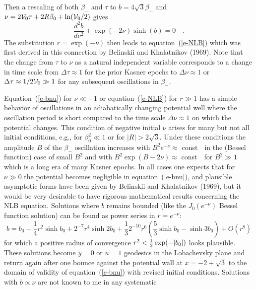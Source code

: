 Then a rescaling of both $\beta_-$ and $\tau$ to $b=4\sqrt{3}\beta_-$
and $\nu = 2{\cal V}_0 \tau + 2R\beta_0 + \ln({\cal V}_0/2)$ gives
\begin{equation}\label{e-bnu}
   \frac{d^2 b}{d\nu^2} + \exp(-2\nu) \sinh(b) = 0 \quad .
\end{equation}
The substitution $r = \exp(-\nu)$ then leads to
equation~(\ref{e-NLB}) which was first derived in this connection by
Belinskii and Khalatnikov (1969). Note that the change from $\tau$
to $\nu$ as a natural independent variable corresponds to a change in
time scale from $\Delta\tau \approx 1$ for the prior Kasner epochs to
$\Delta\nu \approx 1$ or $\Delta\tau \approx 1/2{\cal V}_0 \gg 1$ for
any subsequent oscillations in $\beta_-$.

Equation~(\ref{e-bnu}) for $\nu \ll -1$ or equation~(\ref{e-NLB}) for
$r \gg 1$ has a simple behavior of oscillations in an adiabatically
changing potential well where the oscillation period is short
compared to the time scale $\Delta\nu \approx 1$ on which the
potential changes.  This condition of negative initial $\nu$
arises for many but not all initial conditions, e.g., for $\beta_0^2
\ll 1$ or for $|R| > 2\sqrt{3}$.  Under these conditions the
amplitude $B$ of the $\beta_-$ oscillation increases with $B^2
e^{-\nu} \approx$ const\ \ in the (Bessel function) case of small
$B^2$ and with $B^2\exp(B-2\nu) \approx$ const\ \ for $B^2 \gg 1$
which is a long era of many Kasner epochs.  In all cases one expects
that for $\nu \gg 0$ the potential becomes negligible in
equation~(\ref{e-bnu}), and plausible asymptotic forms have been
given by Belinskii and Khalatnikov (1969), but it would be very
desirable to have rigorous mathematical results concerning the NLB
equation.  Solutions where $b$ remains bounded (like the
$J_0(e^{-\nu})$ Bessel function solution) can be found as power
series in $r=e^{-\nu}$:
\begin{equation}
   b = b_0 - \mbox{$\frac{1}{4}$} r^2 \sinh b_0 + 2^{-7} r^4 \sinh 2b_0
           + \mbox{$\frac{1}{3}$} 2^{-10 }r^6 (\mbox{$\frac{5}{3}$}
                \sinh b_0 - \sinh 3b_0 ) + O(r^8)
\end{equation}
for which a positive radius of convergence $r^2 < \mbox{$\frac{1}{2}$}
\exp(-|b_0|)$ looks plausible.  These solutions become $y=0$ or $u=1$
geodesics in the Lobachevsky plane and return again after one bounce
against the potential wall at $x = -2+\sqrt{3}$ to the domain of
validity of equation~(\ref{e-bnu}) with revised initial conditions.
Solutions with $b \propto \nu$ are not known to me in any systematic
